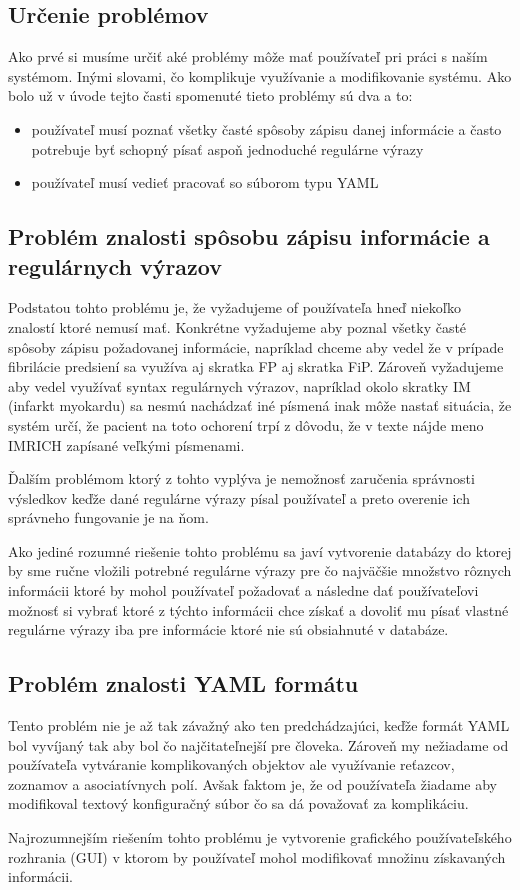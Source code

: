 \subsection{Určenie problémov}

Ako prvé si musíme určiť aké problémy môže mať používateľ pri práci s naším systémom. Inými slovami, čo komplikuje využívanie a modifikovanie systému. Ako bolo už v úvode tejto časti spomenuté tieto problémy sú dva a to:

\begin{itemize}
	\item používateľ musí poznať všetky časté spôsoby zápisu danej informácie a často potrebuje byť schopný písať aspoň jednoduché regulárne výrazy
	\item používateľ musí vedieť pracovať so súborom typu YAML
\end{itemize}

\subsection{Problém znalosti spôsobu zápisu informácie a regulárnych výrazov}

Podstatou tohto problému je, že vyžadujeme of používateľa hneď niekoľko znalostí ktoré nemusí mať. Konkrétne vyžadujeme aby poznal všetky časté spôsoby zápisu požadovanej informácie, napríklad chceme aby vedel že v prípade fibrilácie predsiení sa využíva aj skratka FP aj skratka FiP. Zároveň vyžadujeme aby vedel využívať syntax regulárnych výrazov, napríklad okolo skratky IM (infarkt myokardu) sa nesmú nachádzať iné písmená inak môže nastať situácia, že systém určí, že pacient na toto ochorení trpí z dôvodu, že v texte nájde meno IMRICH zapísané veľkými písmenami. 

Ďalším problémom ktorý z tohto vyplýva je nemožnosť zaručenia správnosti výsledkov keďže dané regulárne výrazy písal používateľ a preto overenie ich správneho fungovanie je na ňom. 

Ako jediné rozumné riešenie tohto problému sa javí vytvorenie databázy do ktorej by sme ručne vložili potrebné regulárne výrazy pre čo najväčšie množstvo rôznych informácii ktoré by mohol používateľ požadovať a následne dať používateľovi možnosť si vybrať ktoré z týchto informácii chce získať a dovoliť mu písať vlastné regulárne výrazy iba pre informácie ktoré nie sú obsiahnuté v databáze.

\subsection{Problém znalosti YAML formátu}

Tento problém nie je až tak závažný ako ten predchádzajúci, keďže formát YAML bol vyvíjaný tak aby bol čo najčitateľnejší pre človeka. Zároveň my nežiadame od používateľa vytváranie komplikovaných objektov ale využívanie reťazcov, zoznamov a asociatívnych polí. Avšak faktom je, že od používateľa žiadame aby modifikoval textový konfiguračný súbor čo sa dá považovať za komplikáciu.

Najrozumnejším riešením tohto problému je vytvorenie grafického používateľského rozhrania (GUI) v ktorom by používateľ mohol modifikovať množinu získavaných informácii. 